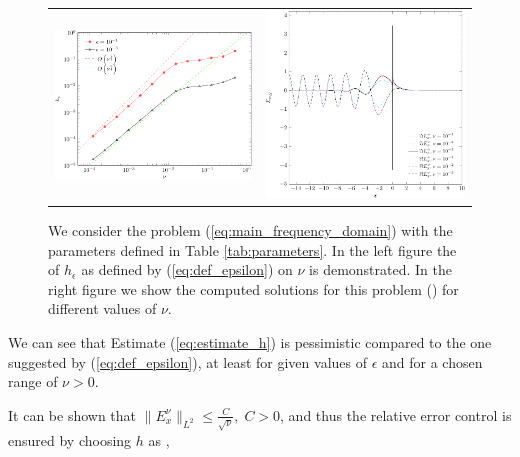 \begin{figure}
\begin{tabular}{cc}
\includegraphics[height=0.32\textwidth]{pics_frequency_domain/h_nu.pdf}
&
\includegraphics[height=0.32\textwidth]{pics_frequency_domain/res_sol.pdf}
\end{tabular}
\caption{We consider the problem (\ref{eq:main_frequency_domain}) with the parameters 
defined in Table \ref{tab:parameters}. In the left figure the  of $h_{\epsilon}$ as defined by (\ref{eq:def_epsilon}) on $\nu$ is demonstrated.  
In the right figure we show the computed solutions for this problem () for different values of $\nu$. }
\label{fig:dependence}
\end{figure}
We can see that Estimate (\ref{eq:estimate_h}) is pessimistic compared to the one suggested by (\ref{eq:def_epsilon}), 
at least for given values of $\epsilon$ and for a chosen range of $\nu>0$.
\begin{remark}
It can be shown that $\|E^{\nu}_{x}\|_{L^2}\leq \frac{C}{\sqrt{\nu}},\; C>0$, 
and thus the relative error control
\bealn
 \leq \epsilon
\eealn
 is ensured by choosing $h$ as , 
\end{remark}

